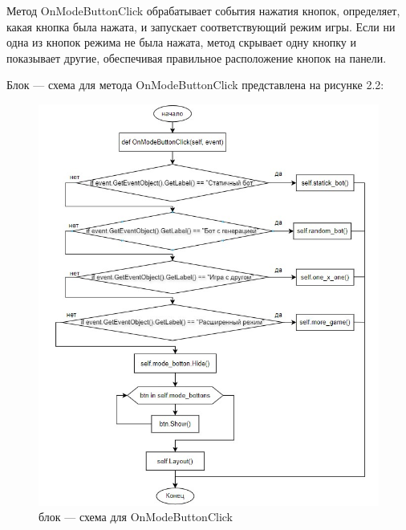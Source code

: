Метод OnModeButtonClick обрабатывает события нажатия кнопок, определяет, какая кнопка была нажата, и запускает соответствующий режим игры. Если ни одна из кнопок режима не была нажата, метод скрывает одну кнопку и показывает другие, обеспечивая правильное расположение кнопок на панели.

Блок --- схема для метода OnModeButtonClick представлена на рисунке 2.2:
\begin{figure}[H]
\graphicspath{ {img/} }
\centering
\includegraphics[width = 15cm]{часть.jpg}
\caption{блок --- схема для OnModeButtonClick}
\end{figure}
